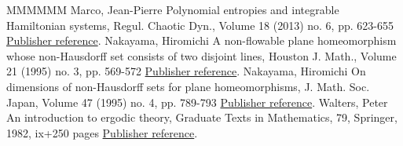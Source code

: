 \begin{thebibliography}{MMMMMM}
 Marco, Jean-Pierre Polynomial entropies and integrable Hamiltonian systems, Regul. Chaotic Dyn., Volume 18 (2013) no. 6, pp. 623-655 \href{https://ahl.centre-mersenne.org/item/AHL_2019__2__39_0/#Mar13}{Publisher reference}.
 Nakayama, Hiromichi A non-flowable plane homeomorphism whose non-Hausdorff set consists of two disjoint lines, Houston J. Math., Volume 21 (1995) no. 3, pp. 569-572 \href{https://ahl.centre-mersenne.org/item/AHL_2019__2__39_0/#Nak95}{Publisher reference}.
 Nakayama, Hiromichi On dimensions of non-Hausdorff sets for plane homeomorphisms, J. Math. Soc. Japan, Volume 47 (1995) no. 4, pp. 789-793 \href{https://ahl.centre-mersenne.org/item/AHL_2019__2__39_0/#Nak95b}{Publisher reference}.
 Walters, Peter An introduction to ergodic theory, Graduate Texts in Mathematics, 79, Springer, 1982, ix+250 pages \href{https://ahl.centre-mersenne.org/item/AHL_2019__2__39_0/#Wal82}{Publisher reference}.
\end{thebibliography}
